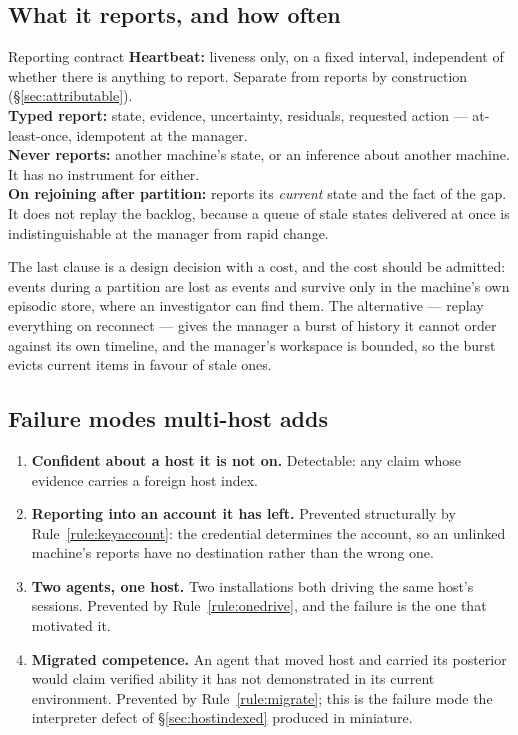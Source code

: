 \documentclass[11pt]{article}
\begin{document}
\subsection{What it reports, and how often}

\begin{specbox}{Reporting contract}
\textbf{Heartbeat:} liveness only, on a fixed interval, independent of whether there is anything to report. Separate from reports by construction (\S\ref{sec:attributable}).\\[3pt]
\textbf{Typed report:} state, evidence, uncertainty, residuals, requested action --- at-least-once, idempotent at the manager.\\[3pt]
\textbf{Never reports:} another machine's state, or an inference about another machine. It has no instrument for either.\\[3pt]
\textbf{On rejoining after partition:} reports its \emph{current} state and the fact of the gap. It does not replay the backlog, because a queue of stale states delivered at once is indistinguishable at the manager from rapid change.
\end{specbox}

The last clause is a design decision with a cost, and the cost should be admitted: events during a partition are lost as events and survive only in the machine's own episodic store, where an investigator can find them. The alternative --- replay everything on reconnect --- gives the manager a burst of history it cannot order against its own timeline, and the manager's workspace is bounded, so the burst evicts current items in favour of stale ones.

\subsection{Failure modes multi-host adds}

\begin{enumerate}
\item \textbf{Confident about a host it is not on.} Detectable: any claim whose evidence carries a foreign host index.
\item \textbf{Reporting into an account it has left.} Prevented structurally by Rule~\ref{rule:keyaccount}: the credential determines the account, so an unlinked machine's reports have no destination rather than the wrong one.
\item \textbf{Two agents, one host.} Two installations both driving the same host's sessions. Prevented by Rule~\ref{rule:onedrive}, and the failure is the one that motivated it.
\item \textbf{Migrated competence.} An agent that moved host and carried its posterior would claim verified ability it has not demonstrated in its current environment. Prevented by Rule~\ref{rule:migrate}; this is the failure mode the interpreter defect of \S\ref{sec:hostindexed} produced in miniature.
\end{enumerate}
\end{document}
